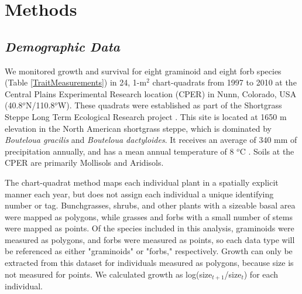 \documentclass[12pt, letterpaper]{article}
\begin{document}
\section{Methods}
\subsection{\textit{Demographic Data}} We monitored growth and survival for eight graminoid and eight forb species (Table \ref{TraitMeasurements}) in 24, 1-m$^2$ chart-quadrats from 1997 to 2010 at the Central Plains Experimental Research location (CPER) in Nunn, Colorado, USA (40.8$^o$N/110.8$^o$W). These quadrats were established as part of the Shortgrass Steppe Long Term Ecological Research project \cite{Chu2013}. This site is located at 1650 m elevation in the North American shortgrass steppe, which is dominated by \textit{Bouteloua gracilis} and \textit{Bouteloua dactyloides}. It receives an average of 340 mm of precipitation annually, and has a mean annual temperature of 8 $^o$C \cite{Chu2014}. Soils at the CPER are primarily Mollisols and Aridisols.

The chart-quadrat method maps each individual plant in a spatially explicit manner each year, but does not assign each individual a unique identifying number or tag. Bunchgrasses, shrubs, and other plants with a sizeable basal area were mapped as polygons, while grasses and forbs with a small number of stems were mapped as points. Of the species included in this analysis, graminoids were measured as polygons, and forbs were measured as points, so each data type will be referenced as either "graminoids" or "forbs," respectively. Growth can only be extracted from this dataset for individuals measured as polygons, because size is not measured for points. We calculated growth as log(size$_{t+1}$/size$_t$) for each individual. 
\end{document}
